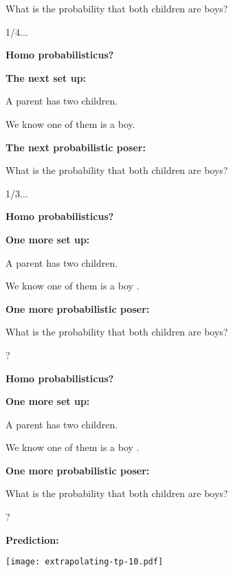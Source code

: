     What is the probability that both
    children are boys?
  
    {\alert{1/4...}}
  




\textbf{Homo probabilisticus?}

\textbf{The next set up:}
  
  
    A parent has two children.
  
    We know one of them is a boy.
  


\textbf{The next probabilistic poser:}
  
  
    What is the probability that both
    children are boys?
  
    {\alert{1/3...}}
  



  \textbf{Homo probabilisticus?}

  \textbf{One more set up:}
    
    
      A parent has two children.
    
      We know one of them is a boy .
    
  
  
  \textbf{One more probabilistic poser:}
    
    
      What is the probability that both
      children are boys?
    
      {\alert{?}}
    
  



  \textbf{Homo probabilisticus?}

  \textbf{One more set up:}
    
    
      A parent has two children.
    
      We know one of them is a boy .
    
  
  
  \textbf{One more probabilistic poser:}
    
    
      What is the probability that both
      children are boys?
    
      {\alert{?}}
    
  


  \textbf{Prediction:}

  \texttt{[image: extrapolating-tp-10.pdf]}\\

